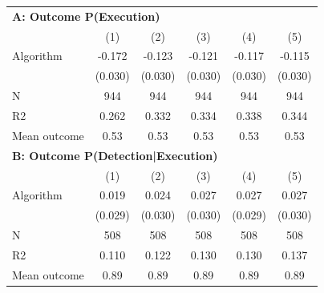 \begin{tabular}{lccccc} \toprule
\multicolumn{6}{l}{\textbf{A: Outcome P(Execution)}} \\ \multicolumn{1}{l}{} & (1) & (2) & (3) & (4) & (5) \\ \midrule
Algorithm   &      -0.172\sym{***}&      -0.123\sym{***}&      -0.121\sym{***}&      -0.117\sym{***}&      -0.115\sym{***}\\
            &     (0.030)         &     (0.030)         &     (0.030)         &     (0.030)         &     (0.030)         \\
\midrule
N           &         944         &         944         &         944         &         944         &         944         \\
R2          &       0.262         &       0.332         &       0.334         &       0.338         &       0.344         \\
Mean outcome&        0.53         &        0.53         &        0.53         &        0.53         &        0.53         \\

\midrule \multicolumn{6}{l}{\textbf{B: Outcome P(Detection|Execution)}} \\ \multicolumn{1}{l}{} & (1) & (2) & (3) & (4) & (5) \\ \midrule
Algorithm   &       0.019         &       0.024         &       0.027         &       0.027         &       0.027         \\
            &     (0.029)         &     (0.030)         &     (0.030)         &     (0.029)         &     (0.030)         \\
\midrule
N           &         508         &         508         &         508         &         508         &         508         \\
R2          &       0.110         &       0.122         &       0.130         &       0.130         &       0.137         \\
Mean outcome&        0.89         &        0.89         &        0.89         &        0.89         &        0.89         \\


\end{tabular}
